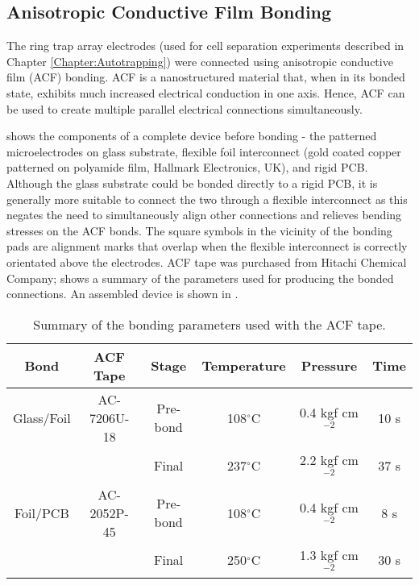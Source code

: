\subsection{Anisotropic Conductive Film Bonding}
\label{Section:Foil_bondng}
The ring trap array electrodes (used for cell separation experiments described in Chapter \ref{Chapter:Autotrapping}) were connected using anisotropic conductive film (ACF) bonding. ACF is a nanostructured material that, when in its bonded state, exhibits much increased electrical conduction in one axis. Hence, ACF can be used to create multiple parallel electrical connections simultaneously. 

 shows the components of a complete device before bonding - the patterned microelectrodes on glass substrate, flexible foil interconnect (gold coated copper patterned on polyamide film, Hallmark Electronics, UK), and rigid PCB. Although the glass substrate could be bonded directly to a rigid PCB, it is generally more suitable to connect the two through a flexible interconnect as this negates the need to simultaneously align other connections and relieves bending stresses on the ACF bonds. The square symbols in the vicinity of the bonding pads are alignment marks that overlap when the flexible interconnect is correctly orientated above the electrodes. ACF tape was purchased from Hitachi Chemical Company;  shows a summary of the parameters used for producing the bonded connections. An assembled device is shown in .

\begin{table}[!h]
	\centering
		\begin{tabular} { c c c c c c }
		\hline
			Bond & ACF Tape & Stage & Temperature & Pressure & Time \\		
		\hline
			Glass/Foil & AC-7206U-18 & Pre-bond & 108$^{\circ}$C & 0.4 kgf cm$^{-2}$ & 10 s \\
			  				&   					& Final & 237$^{\circ}$C & 2.2 kgf cm$^{-2}$ & 37 s \\
			Foil/PCB & AC-2052P-45 & Pre-bond & 108$^{\circ}$C & 0.4 kgf cm$^{-2}$ & 8 s \\
							 &  					 & Final & 250$^{\circ}$C & 1.3 kgf cm$^{-2}$ & 30 s \\
		\hline			
		\end{tabular}
	\caption[Summary of the bonding parameters used with ACF tape.]{Summary of the bonding parameters used with the ACF tape.}
	\label{tab:ACF_parameters}
\end{table}

